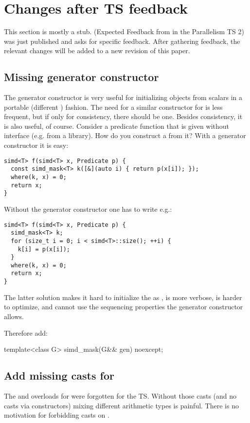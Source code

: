 \section{Changes after TS feedback}
This section is mostly a stub.
\cite{P1915R0} (Expected Feedback from  in the Parallelism TS 2) was just published and asks for specific feedback.
After gathering feedback, the relevant changes will be added to a new revision of this paper.

\subsection{Missing  generator constructor}
The  generator constructor is very useful for initializing objects from scalars in a portable (different ) fashion.
The need for a similar constructor for  is less frequent, but if only for consistency, there should be one.
Besides consistency, it is also useful, of course.
Consider a predicate function that is given without  interface (e.g. from a library).
How do you construct a  from it?
With a generator constructor it is easy:
\medskip\begin{lstlisting}[style=Vc]
simd<T> f(simd<T> x, Predicate p) {
  const simd_mask<T> k([&](auto i) { return p(x[i]); });
  where(k, x) = 0;
  return x;
}
\end{lstlisting}
Without the generator constructor one has to write e.g.:
\medskip\begin{lstlisting}[style=Vc]
simd<T> f(simd<T> x, Predicate p) {
  simd_mask<T> k;
  for (size_t i = 0; i < simd<T>::size(); ++i) {
    k[i] = p(x[i]);
  }
  where(k, x) = 0;
  return x;
}
\end{lstlisting}
The latter solution makes it hard to initialize the  as , is more verbose, is harder to optimize, and cannot use the sequencing properties the generator constructor allows.

Therefore add:
\begin{wgText}
\begin{itemdecl}
template<class G> simd_mask(G&& gen) noexcept;
\end{itemdecl}
\end{wgText}

\subsection{Add missing casts for }
The  and  overloads for  were forgotten for the TS.
Without those casts (and no casts via constructors) mixing different arithmetic types is painful.
There is no motivation for forbidding casts on .

